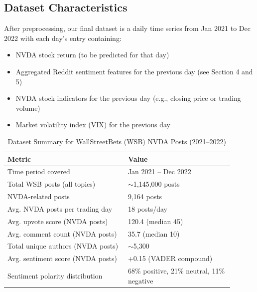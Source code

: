 \documentclass[conference]{IEEEtran}
\begin{document}
\subsection{Dataset Characteristics}
After preprocessing, our final dataset is a daily time series from Jan 2021 to Dec 2022 with each day’s entry containing:
\begin{itemize}
	\item NVDA stock return (to be predicted for that day)
	\item Aggregated Reddit sentiment features for the previous day (see Section 4 and 5)
	\item NVDA stock indicators for the previous day (e.g., closing price or trading volume)
	\item Market volatility index (VIX) for the previous day
\end{itemize}

\begin{table}[ht]
	\caption{Dataset Summary for WallStreetBets (WSB) NVDA Posts (2021--2022)}
	\label{tab:wsb_dataset_summary}
	\centering
	\renewcommand{\arraystretch}{1.1}
	\setlength{\tabcolsep}{2pt}
	\begin{tabular}{p{0.48\linewidth}|p{0.42\linewidth}}
		\hline
		\textbf{Metric}                   & \textbf{Value}                             \\
		\hline
		Time period covered               & Jan 2021 -- Dec 2022                       \\
		Total WSB posts (all topics)      & $\sim$1,145,000 posts                      \\
		NVDA-related posts                & 9,164 posts                                \\
		Avg. NVDA posts per trading day   & 18 posts/day                               \\
		Avg. upvote score (NVDA posts)    & 120.4 (median 45)                          \\
		Avg. comment count (NVDA posts)   & 35.7 (median 10)                           \\
		Total unique authors (NVDA posts) & $\sim$5,300                                \\
		Avg. sentiment score (NVDA posts) & +0.15 (VADER compound)                     \\
		Sentiment polarity distribution   & 68\% positive, 21\% neutral, 11\% negative \\
		\hline
	\end{tabular}
\end{table}
\end{document}
